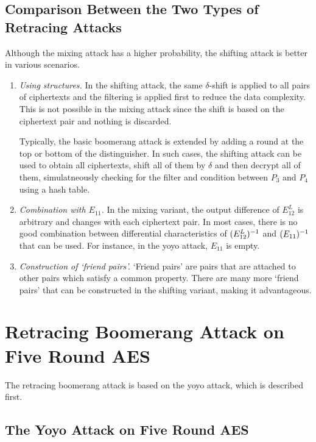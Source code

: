\documentclass[twoside]{article}
\begin{document}
\subsection{Comparison Between the Two Types of Retracing Attacks}

Although the mixing attack has a higher probability, the shifting attack is
better in various scenarios.
\begin{enumerate}
    \item \emph{Using structures.} In the shifting attack, the same
    \(\delta\)-shift is applied to all pairs of ciphertexts and the filtering is
    applied first to reduce the data complexity. This is not possible in the
    mixing attack since the shift is based on the ciphertext pair and nothing is
    discarded. 
    
    Typically, the basic boomerang attack is extended by adding a round at the
    top or bottom of the distinguisher. In such cases, the shifting attack can
    be used to obtain all ciphertexts, shift all of them by \(\delta\) and then
    decrypt all of them, simulatneously checking for the filter and condition
    between \(P_3\) and \(P_4\) using a hash table.
    
    \item \emph{Combination with \(E_{11}\).} In the mixing variant, the output
    difference of \(E_{12}^L\) is arbitrary and changes with each ciphertext
    pair. In most cases, there is no good combination between differential
    characteristics of \((E_{12}^L)^{-1}\) and \((E_{11})^{-1}\) that
    can be used. For instance, in the yoyo attack, \(E_{11}\) is empty.

    \item \emph{Construction of `friend pairs'.} `Friend pairs' are pairs that
    are attached to other pairs which satisfy a common property. There are many
    more `friend pairs' that can be constructed in the shifting variant, making
    it advantageous.
\end{enumerate}

\section{Retracing Boomerang Attack on Five Round AES}

The retracing boomerang attack is based on the yoyo attack, which is described
first.

\subsection{The Yoyo Attack on Five Round AES}
\end{document}
